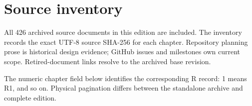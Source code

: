 \chapter{Source inventory}\label{source-inventory}

All 426 archived source documents in this edition are included. The inventory records the exact UTF-8 source SHA-256 for each chapter. Repository planning prose is historical design evidence; GitHub issues and milestones own current scope. Retired-document links resolve to the archived base revision.

The numeric chapter field below identifies the corresponding R record: 1 means R1, and so on. Physical pagination differs between the standalone archive and complete edition.


